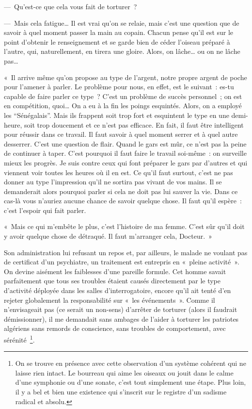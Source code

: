 \documentclass[french,twoside]{book} %
\begin{document}
— Qu’est-ce que cela vous fait de torturer ?\par
 — Mais cela fatigue… Il est vrai qu’on se relaie, mais c’est une question que de savoir à quel moment passer la main au copain. Chacun pense qu’il est sur le point d’obtenir le renseignement et se garde bien de céder l’oiseau préparé à l’autre, qui, naturellement, en tirera une gloire. Alors, on lâche… ou on ne lâche pas…\par
« Il arrive même qu’on propose au type de l’argent, notre propre argent de poche pour l’amener à parler. Le problème pour nous, en effet, est le suivant : es-tu capable de faire parler ce type ? C’est un problème de succès personnel ; on est en compétition, quoi… On a eu à la fin les poings esquintés. Alors, on a employé les “Sénégalais”. Mais ils frappent soit trop fort et esquintent le type en une demi-heure, soit trop doucement et ce n’est pas efficace. En fait, il faut être intelligent pour réussir dans ce travail. Il faut savoir à quel moment serrer et à quel autre desserrer. C’est une question de flair. Quand le gars est mûr, ce n’est pas la peine de continuer à taper. C’est pourquoi il faut faire le travail soi-même : on surveille mieux les progrès. Je suis contre ceux qui font préparer le gars par d’autres et qui viennent voir toutes les heures où il en est. Ce qu’il faut surtout, c’est ne pas donner au type l’impression qu’il ne sortira pas vivant de vos mains. Il se demanderait alors pourquoi parler si cela ne doit pas lui sauver la vie. Dans ce cas-là vous n’auriez aucune chance de savoir quelque chose. Il faut qu’il espère : c’est l’espoir qui fait parler.\par
« Mais ce qui m’embête le plus, c’est l’histoire de ma femme. C’est sûr qu’il doit y avoir quelque chose de détraqué. Il faut m’arranger cela, Docteur. »\par
Son administration lui refusant un repos et, par ailleurs, le malade ne voulant pas de certificat d’un psychiatre, un traitement est entrepris en « pleine activité ». On devine aisément les faiblesses d’une pareille formule. Cet homme savait parfaitement que tous ses troubles étaient causés directement par le type d’activité déployée dans les salles d’interrogatoire, encore qu’il ait tenté d’en rejeter globalement la responsabilité sur « les événements ». Comme il n’envisageait pas (ce serait un non-sens)   d’arrêter de torturer (alors il faudrait démissionner), il me demandait sans ambages de l’aider à torturer les patriotes algériens sans remords de conscience, sans troubles de comportement, avec sérénité \footnote{On se trouve en présence avec cette observation d’un système cohérent qui ne laisse rien intact. Le bourreau qui aime les oiseaux ou jouit dans le calme d’une symphonie ou d’une sonate, c’est tout simplement une étape. Plus loin, il y a bel et bien une existence qui s’inscrit sur le registre d’un sadisme radical et absolu.}.\par
\end{document}
